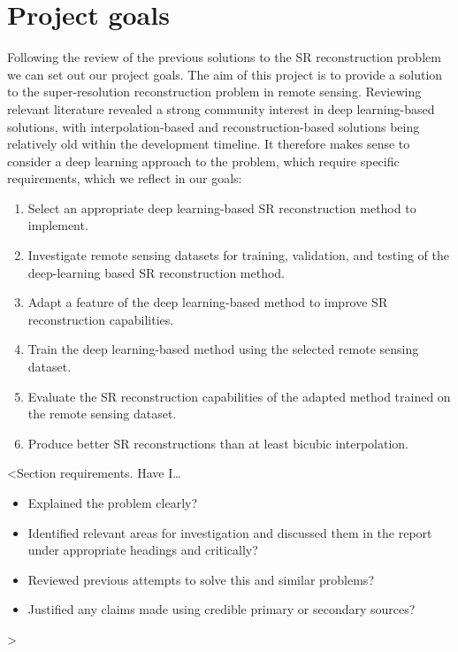 \section{Project goals}
Following the review of the previous solutions to the SR reconstruction problem we can set out our project goals. The aim of this project is to provide a solution to the super-resolution reconstruction problem in remote sensing. Reviewing relevant literature revealed a strong community interest in deep learning-based solutions, with interpolation-based and reconstruction-based solutions being relatively old within the development timeline. It therefore makes sense to consider a deep learning approach to the problem, which require specific requirements, which we reflect in our goals:
\begin{enumerate}
    \item Select an appropriate deep learning-based SR reconstruction method to implement.
    \item Investigate remote sensing datasets for training, validation, and testing of the deep-learning based SR reconstruction method.
    \item Adapt a feature of the deep learning-based method to improve SR reconstruction capabilities.
    \item Train the deep learning-based method using the selected remote sensing dataset.
    \item Evaluate the SR reconstruction capabilities of the adapted method trained on the remote sensing dataset.
    \item Produce better SR reconstructions than at least bicubic interpolation.
\end{enumerate}

<Section requirements. Have I\dots
\begin{itemize}
    \item Explained the problem clearly?
    \item Identified relevant areas for investigation and discussed them in the report under appropriate headings and critically?
    \item Reviewed previous attempts to solve this and similar problems?
    \item Justified any claims made using credible primary or secondary sources?
\end{itemize}
>